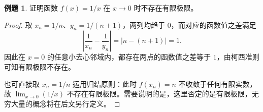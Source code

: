 \documentclass[UTF8,fontset=fandol,a4paper,12pt]{ctexart}
\theoremstyle{definition}
\newtheorem*{example}{例题}
\begin{document}
\begin{example}
证明函数 $f(x)=1/x$ 在 $x\to0$ 时不存在有限极限。
\end{example}
\begin{proof}
取 $x_n=1/n$、$y_n=1/(n+1)$，两列均趋于 $0$，而对应的函数值之差满足
\[
 \left|\frac1{x_n}-\frac1{y_n}\right|=|n-(n+1)|=1.
\]
因此在 $x=0$ 的任意小去心邻域内，都存在两点的函数值之差等于 $1$，由柯西准则可知有限极限不存在。

也可直接取 $x_n=1/n$ 运用归结原则：此时 $f(x_n)=n$ 不收敛于任何有限实数，故 $\lim_{x\to0}(1/x)$ 不存在有限极限。需要说明的是，这里否定的是有限极限，无穷大量的概念将在后文另行定义。
\end{proof}
\end{document}
